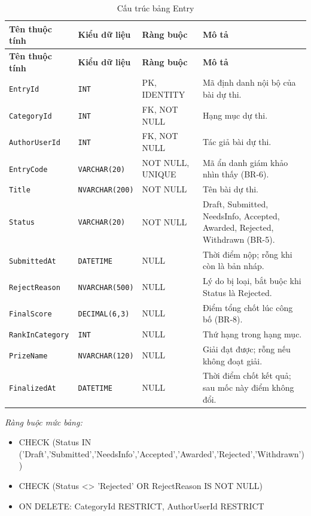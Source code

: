 \begin{longtable}{|L{4cm}|L{3.15cm}|L{2.4cm}|L{4.55cm}|}
\caption{Cấu trúc bảng Entry} \\
\hline
\textbf{Tên thuộc tính} & \textbf{Kiểu dữ liệu} & \textbf{Ràng buộc} & \textbf{Mô tả} \\ \hline
\endfirsthead
\hline
\textbf{Tên thuộc tính} & \textbf{Kiểu dữ liệu} & \textbf{Ràng buộc} & \textbf{Mô tả} \\ \hline
\endhead
\texttt{EntryId} & \texttt{INT} & PK, IDENTITY & Mã định danh nội bộ của bài dự thi. \\ \hline
\texttt{CategoryId} & \texttt{INT} & FK, NOT NULL & Hạng mục dự thi. \\ \hline
\texttt{AuthorUserId} & \texttt{INT} & FK, NOT NULL & Tác giả bài dự thi. \\ \hline
\texttt{EntryCode} & \texttt{VARCHAR(20)} & NOT NULL, UNIQUE & Mã ẩn danh giám khảo nhìn thấy (BR-6). \\ \hline
\texttt{Title} & \texttt{NVARCHAR(200)} & NOT NULL & Tên bài dự thi. \\ \hline
\texttt{Status} & \texttt{VARCHAR(20)} & NOT NULL & Draft, Submitted, NeedsInfo, Accepted, Awarded, Rejected, Withdrawn (BR-5). \\ \hline
\texttt{SubmittedAt} & \texttt{DATETIME} & NULL & Thời điểm nộp; rỗng khi còn là bản nháp. \\ \hline
\texttt{RejectReason} & \texttt{NVARCHAR(500)} & NULL & Lý do bị loại, bắt buộc khi Status là Rejected. \\ \hline
\texttt{FinalScore} & \texttt{DECIMAL(6,3)} & NULL & Điểm tổng chốt lúc công bố (BR-8). \\ \hline
\texttt{RankInCategory} & \texttt{INT} & NULL & Thứ hạng trong hạng mục. \\ \hline
\texttt{PrizeName} & \texttt{NVARCHAR(120)} & NULL & Giải đạt được; rỗng nếu không đoạt giải. \\ \hline
\texttt{FinalizedAt} & \texttt{DATETIME} & NULL & Thời điểm chốt kết quả; sau mốc này điểm không đổi. \\ \hline
\end{longtable}

\noindent\textit{Ràng buộc mức bảng:}

\begin{itemize}\raggedright
    \item CHECK (Status IN ('Draft',\allowbreak{}'Submitted',\allowbreak{}'NeedsInfo',\allowbreak{}'Accepted',\allowbreak{}'Awarded',\allowbreak{}'Rejected',\allowbreak{}'Withdrawn'))
    \item CHECK (Status <> 'Rejected' OR RejectReason IS NOT NULL)
    \item ON DELETE: CategoryId RESTRICT,\allowbreak{} AuthorUserId RESTRICT
\end{itemize}


